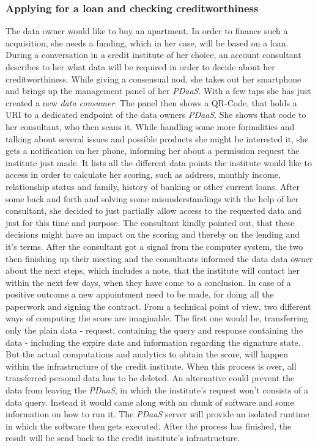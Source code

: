 \documentclass[12pt,english,a4paper,titlepage,cleardoublepage=empty,dottedtoc]{report}
\begin{document}
\subsubsection{Applying for a loan and checking
creditworthiness}\label{applying-for-a-loan-and-checking-creditworthiness}

The data owner would like to buy an apartment. In order to finance such
a acquisition, she needs a funding, which in her case, will be based on
a loan. During a conversation in a credit institute of her choice, an
account consultant describes to her what data will be required in order
to decide about her creditworthiness. While giving a consensual nod, she
takes out her smartphone and brings up the management panel of her
\emph{PDaaS}. With a few taps she has just created a new \emph{data
consumer}. The panel then shows a QR-Code, that holds a URI to a
dedicated endpoint of the data owners \emph{PDaaS}. She shows that code
to her consultant, who then scans it. While handling some more
formalities and talking about several issues and possible products she
might be interested it, she gets a notification on her phone, informing
her about a permission request the institute just made. It lists all the
different data points the institute would like to access in order to
calculate her scoring, such as address, monthly income, relationship
status and family, history of banking or other current loans. After some
back and forth and solving some misunderstandings with the help of her
consultant, she decided to just partially allow access to the requested
data and just for this time and purpose. The consultant kindly pointed
out, that these decisions might have an impact on the scoring and
thereby on the lending and it's terms. After the consultant got a signal
from the computer system, the two then finishing up their meeting and
the consultants informed the data data owner about the next steps, which
includes a note, that the institute will contact her within the next few
days, when they have come to a conclusion. In case of a positive outcome
a new appointment need to be made, for doing all the paperwork and
signing the contract. From a technical point of view, two different ways
of computing the score are imaginable. The first one would be,
transferring only the plain data - request, containing the query and
response containing the data - including the expire date and information
regarding the signature state. But the actual computations and analytics
to obtain the score, will happen within the infrastructure of the credit
institute. When this process is over, all transferred personal data has
to be deleted. An alternative could prevent the data from leaving the
\emph{PDaaS}, in which the institute's request won't consists of a data
query. Instead it would came along with an chunk of software and some
information on how to run it. The \emph{PDaaS} server will provide an
isolated runtime in which the software then gets executed. After the
process has finished, the result will be send back to the credit
institute's infrastructure.
\end{document}
